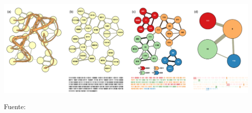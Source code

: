 \documentclass[letterpaper, 11pt]{book}
\theoremstyle{definition}
\theoremstyle{remark}
\begin{document}
\hspace{-1em}\begin{minipage}{\linewidth}
\centering
{} \label{1.9_infomap}
\hspace{-1.5em}\includegraphics[scale=0.52]{img/1.9_infomap.png}
\par\bigskip
\small Fuente: \citet{2009_Rosvall_MapEquation}
\end{minipage}\bigskip
\end{document}
